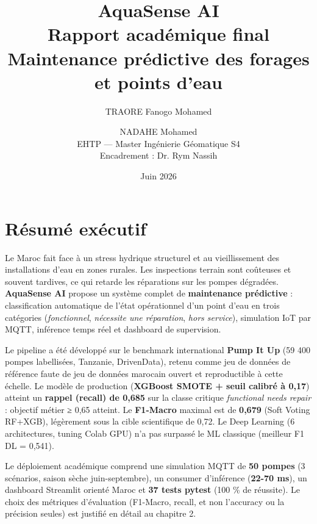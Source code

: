 \documentclass[11pt,a4paper]{report}
\title{AquaSense AI\\[0.4em]\large Rapport académique final\\Maintenance prédictive des forages et points d'eau}
\author{TRAORE Fanogo Mohamed \and NADAHE Mohamed\\EHTP --- Master Ingénierie Géomatique S4\\Encadrement : Dr. Rym Nassih}
\date{Juin 2026}
\begin{document}
\maketitle
\tableofcontents
\newpage








\chapter*{Résumé exécutif}




Le Maroc fait face à un stress hydrique structurel et au vieillissement des installations d'eau en zones rurales. Les inspections terrain sont coûteuses et souvent tardives, ce qui retarde les réparations sur les pompes dégradées. \textbf{AquaSense AI} propose un système complet de \textbf{maintenance prédictive} : classification automatique de l'état opérationnel d'un point d'eau en trois catégories (\textit{fonctionnel}, \textit{nécessite une réparation}, \textit{hors service}), simulation IoT par MQTT, inférence temps réel et dashboard de supervision.



Le pipeline a été développé sur le benchmark international \textbf{Pump It Up} (59 400 pompes labellisées, Tanzanie, DrivenData), retenu comme jeu de données de référence faute de jeu de données marocain ouvert et reproductible à cette échelle. Le modèle de production (\textbf{XGBoost SMOTE + seuil calibré à 0,17}) atteint un \textbf{rappel (recall) de 0,685} sur la classe critique \textit{functional needs repair} : objectif métier ≥ 0,65 atteint. Le \textbf{F1-Macro} maximal est de \textbf{0,679} (Soft Voting RF+XGB), légèrement sous la cible scientifique de 0,72. Le Deep Learning (6 architectures, tuning Colab GPU) n'a pas surpassé le ML classique (meilleur F1 DL = 0,541).



Le déploiement académique comprend une simulation MQTT de \textbf{50 pompes} (3 scénarios, saison sèche juin-septembre), un consumer d'inférence (\textbf{22-70 ms}), un dashboard Streamlit orienté Maroc et \textbf{37 tests pytest} (100 \% de réussite). Le choix des métriques d'évaluation (F1-Macro, recall, et non l'accuracy ou la précision seules) est justifié en détail au chapitre 2.
\end{document}
